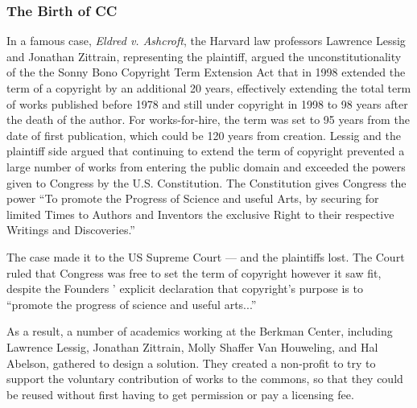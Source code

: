 \subsubsection{The Birth of \ac{CC}}

In a famous case, \textit{Eldred v. Ashcroft}, the Harvard law professors Lawrence Lessig and Jonathan Zittrain, representing the plaintiff, argued the unconstitutionality of the the Sonny Bono Copyright Term Extension Act that in 1998 extended the term of a copyright by an additional 20 years, effectively extending the total term of works published before 1978 and still under copyright in 1998 to 98 years after the death of the author. For works-for-hire, the term was set to 95 years from the date of first publication, which could be 120 years from creation. Lessig and the plaintiff side argued that continuing to extend the term of copyright prevented a large number of works from entering the public domain and exceeded the powers given to Congress by the U.S. Constitution. The Constitution gives Congress the power ``To promote the Progress of Science and useful Arts, by securing for limited Times to Authors and Inventors the exclusive Right to their respective Writings and Discoveries.''

The case made it to the US Supreme Court --- and the plaintiffs lost. The Court ruled that Congress was free to set the term of copyright however it saw fit, despite the Founders ' explicit declaration that copyright's purpose is to ``promote the progress of science and useful arts...''

As a result, a number of academics working at the Berkman Center, including Lawrence Lessig, Jonathan Zittrain, Molly Shaffer Van Houweling, and Hal Abelson, gathered to design a solution. They created a non-profit to try to support the voluntary contribution of works to the commons, so that they could be reused without first having to get permission or pay a licensing fee.

